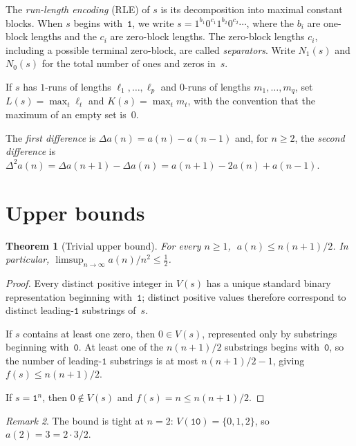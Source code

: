 \documentclass[11pt,a4paper]{article}
\theoremstyle{plain}
\newtheorem{theorem}{Theorem}[section]
\theoremstyle{definition}
\theoremstyle{remark}
\newtheorem{remark}[theorem]{Remark}
\newcommand{\ones}{N_1}
\newcommand{\zeros}{N_0}
\newcommand{\Da}{\Delta a}
\newcommand{\DDa}{\Delta^2 a}
\begin{document}
The \emph{run-length encoding} (RLE) of $s$ is its decomposition into
maximal constant blocks.  When $s$ begins with~$\mathtt{1}$, we write
$s = 1^{b_1} 0^{c_1} 1^{b_2} 0^{c_2} \cdots$, where the $b_i$ are
one-block lengths and the $c_i$ are zero-block lengths.  The zero-block
lengths $c_i$, including a possible terminal zero-block, are called
\emph{separators}.  Write $\ones(s)$ and $\zeros(s)$ for the total
number of ones and zeros in~$s$.

If $s$ has $1$-runs of lengths $\ell_1,\ldots,\ell_p$ and $0$-runs of
lengths $m_1,\ldots,m_q$, set
$L(s) = \max_t \ell_t$ and $K(s) = \max_t m_t$, with the convention
that the maximum of an empty set is~$0$.

The \emph{first difference} is $\Da(n) = a(n) - a(n{-}1)$ and, for
$n \ge 2$, the \emph{second difference} is
$\DDa(n) = \Da(n{+}1)-\Da(n) = a(n{+}1) - 2a(n) + a(n{-}1)$.

\section{Upper bounds}\label{sec:upper}

\begin{theorem}[Trivial upper bound]\label{thm:upper}
  For every $n \ge 1$, $\;a(n) \le n(n{+}1)/2$.
  In particular, $\limsup_{n\to\infty} a(n)/n^2 \le \frac{1}{2}$.
\end{theorem}

\begin{proof}
  Every distinct positive integer in $V(s)$ has a unique standard
  binary representation beginning with~$\mathtt{1}$; distinct
  positive values therefore correspond to distinct
  leading-$\mathtt{1}$ substrings of~$s$.

  If $s$ contains at least one zero, then $0 \in V(s)$, represented
  only by substrings beginning with~$\mathtt{0}$.  At least one of
  the $n(n{+}1)/2$ substrings begins with~$\mathtt{0}$, so the
  number of leading-$\mathtt{1}$ substrings is at most
  $n(n{+}1)/2 - 1$, giving $f(s) \le n(n{+}1)/2$.

  If $s = \mathtt{1}^n$, then $0 \notin V(s)$ and
  $f(s) = n \le n(n{+}1)/2$.
\end{proof}

\begin{remark}\label{rem:tight-upper}
  The bound is tight at $n = 2$:
  $V(\mathtt{10}) = \{0, 1, 2\}$, so $a(2) = 3 = 2 \cdot 3/2$.
\end{remark}
\end{document}
